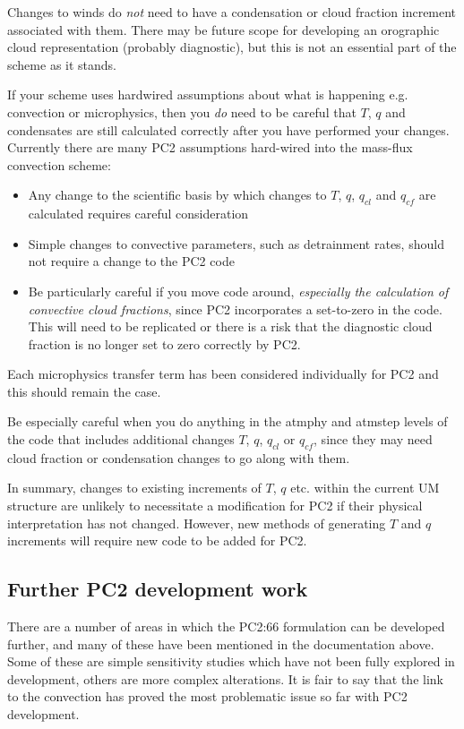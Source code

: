 \documentclass{UMDP_article}
\begin{document}
Changes to winds do \textit{not} need to have a condensation or
cloud fraction increment
associated with them. There may be future scope for developing an
orographic cloud representation (probably diagnostic), but this is not
an essential part of the scheme as it stands. 

If your scheme uses hardwired assumptions about what is happening e.g.
convection or microphysics, then you \textit{do} need to be careful that
$T$, $q$ and condensates
are still calculated correctly after you have performed your changes.
Currently there are many PC2 assumptions hard-wired into the mass-flux
convection scheme:
\begin{itemize}
\item{Any change to the scientific basis by which changes to $T$, $q$, $q_{cl}$ and $q_{cf}$ are calculated requires careful consideration}
\item{Simple changes to convective parameters, such as detrainment rates, should not require a change to the PC2 code}
\item{Be particularly careful if you move code around, \textit{especially the calculation of convective cloud fractions}, since PC2 incorporates a set-to-zero in the code. This will need to be replicated or there is a risk that the diagnostic cloud fraction is no longer set to zero correctly by PC2.}
\end{itemize}
Each microphysics transfer term has been considered individually for PC2 and this
should remain the case.

Be especially careful when you do anything in the atmphy and atmstep levels of
the code that includes additional changes $T$, $q$, $q_{cl}$ or $q_{cf}$, since
they may need cloud fraction or condensation changes to go along with them.

In summary, changes to existing increments of $T$, $q$ etc. within the current
UM structure are unlikely to
necessitate a modification for PC2 if their physical interpretation has not
changed. However, new methods of generating $T$ and
$q$ increments will require new code to be added for PC2.

\subsection{Further PC2 development work}
There are a number of areas in which the PC2:66 formulation can be
developed further, and many of these have been mentioned in the documentation
above. Some
of these are simple sensitivity studies which have not been fully explored in
development, others are more complex alterations. It is fair to say
that the link to the convection has proved the most problematic issue
so far with PC2 development.
\end{document}
